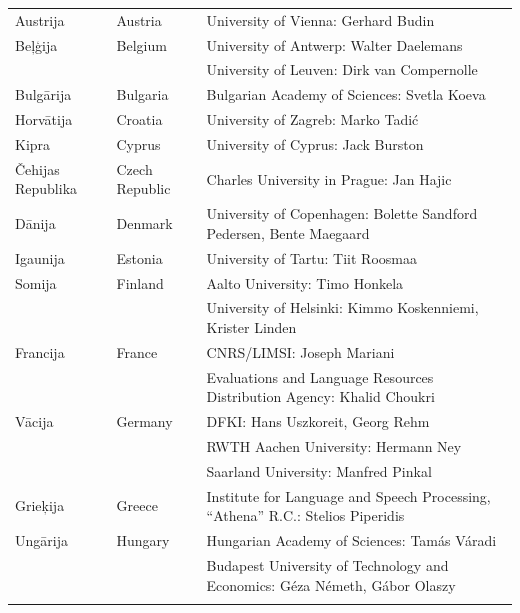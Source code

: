 \small
\begin{longtable}{llp{105mm}}
  Austrija & \textcolor{grey1}{Austria} & University of Vienna: Gerhard Budin \\ \addlinespace
  Beļģija  & \textcolor{grey1}{Belgium} & University of Antwerp: Walter Daelemans \\ \addlinespace 
  & & University of Leuven: Dirk van Compernolle \\ \addlinespace 
  Bulgārija  & \textcolor{grey1}{Bulgaria} & Bulgarian Academy of Sciences: Svetla Koeva \\ \addlinespace
  Horvātija  & \textcolor{grey1}{Croatia} & University of Zagreb: Marko Tadić \\ \addlinespace
  Kipra  & \textcolor{grey1}{Cyprus} & University of Cyprus: Jack Burston \\ \addlinespace
  Čehijas Republika & \textcolor{grey1}{Czech Republic} & Charles University in Prague: Jan Hajic \\ \addlinespace
  Dānija  &  \textcolor{grey1}{Denmark} & University of Copenhagen: Bolette Sandford Pedersen, Bente Maegaard \\ \addlinespace
  Igaunija  & \textcolor{grey1}{Estonia} & University of Tartu: Tiit Roosmaa \\ \addlinespace 
  Somija  & \textcolor{grey1}{Finland} & Aalto University: Timo Honkela \\ \addlinespace 
  & & University of Helsinki: Kimmo Koskenniemi, Krister Linden \\ \addlinespace
  Francija  & \textcolor{grey1}{France} & CNRS/LIMSI: Joseph Mariani \\ \addlinespace 
  & & Evaluations and Language Resources Distribution Agency: Khalid Choukri \\ \addlinespace 
  Vācija  & \textcolor{grey1}{Germany} & DFKI: Hans Uszkoreit, Georg Rehm \\ \addlinespace
  & & RWTH Aachen University: Hermann Ney \\ \addlinespace 
  & & Saarland University: Manfred Pinkal \\ \addlinespace 
  Grieķija  & \textcolor{grey1}{Greece} & Institute for Language and Speech Processing, “Athena” R.C.: Stelios Piperidis \\ \addlinespace
  Ungārija  & \textcolor{grey1}{Hungary} & Hungarian Academy of Sciences: Tamás Váradi \\ \addlinespace
  & & Budapest University of Technology and Economics: Géza Németh, Gábor Olaszy \\ \addlinespace 

\end{longtable}
